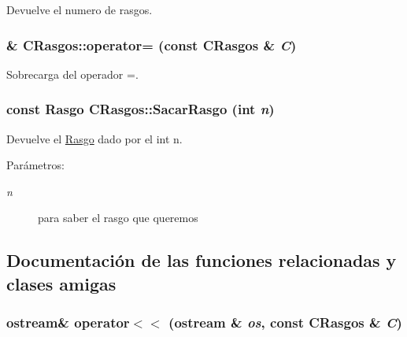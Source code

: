 Devuelve el numero de rasgos. 

\hypertarget{class_c_rasgos_8783aed7d3c09e9f503b48efc84f3102}{
\subsubsection[{operator=}]{ \& CRasgos::operator= (const {\bf CRasgos} \& {\em C})}}
\label{class_c_rasgos_8783aed7d3c09e9f503b48efc84f3102}


Sobrecarga del operador =. 

\hypertarget{class_c_rasgos_4ecb8e73d826f5d236e3caa2f86e954d}{
\subsubsection[{SacarRasgo}]{\setlength{\rightskip}{0pt plus 5cm}const {\bf Rasgo} CRasgos::SacarRasgo (int {\em n})}}
\label{class_c_rasgos_4ecb8e73d826f5d236e3caa2f86e954d}


Devuelve el \hyperlink{class_rasgo}{Rasgo} dado por el int n. 

\begin{Desc}
\item[Parámetros:]
\begin{description}
\item[{\em n}]para saber el rasgo que queremos \end{description}
\end{Desc}


\subsection{Documentación de las funciones relacionadas y clases amigas}
\hypertarget{class_c_rasgos_1ecae6e3da0974de7223e11adedcec37}{
\subsubsection[{operator$<$$<$}]{\setlength{\rightskip}{0pt plus 5cm}ostream\& operator$<$$<$ (ostream \& {\em os}, \/  const {\bf CRasgos} \& {\em C})}}
\label{class_c_rasgos_1ecae6e3da0974de7223e11adedcec37}


